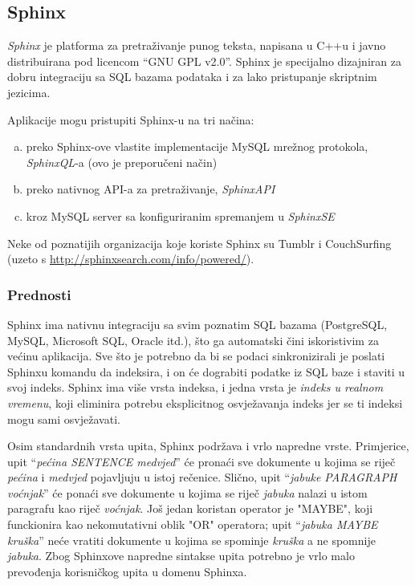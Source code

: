 \documentclass[a4paper,twoside,12pt]{scrreprt}
\begin{document}
\subsection{Sphinx}

\textit{Sphinx} je platforma za pretraživanje punog teksta, napisana u C++u i javno distribuirana pod licencom ``GNU GPL v2.0''. Sphinx je specijalno dizajniran za dobru integraciju sa SQL bazama podataka i za lako pristupanje skriptnim jezicima.

Aplikacije mogu pristupiti Sphinx-u na tri načina:

\begin{enumerate}[(a)]
  \item preko Sphinx-ove vlastite implementacije MySQL mrežnog protokola, \textit{SphinxQL}-a (ovo je preporučeni način)
  \item preko nativnog API-a za pretraživanje, \textit{SphinxAPI}
  \item kroz MySQL server sa konfiguriranim spremanjem u \textit{SphinxSE}
\end{enumerate}

Neke od poznatijih organizacija koje koriste Sphinx su Tumblr i CouchSurfing (uzeto s \url{http://sphinxsearch.com/info/powered/}).

\subsubsection{Prednosti}

Sphinx ima nativnu integraciju sa svim poznatim SQL bazama (PostgreSQL, MySQL, Microsoft SQL, Oracle itd.), što ga automatski čini iskoristivim za većinu aplikacija. Sve što je potrebno da bi se podaci sinkronizirali je poslati Sphinxu komandu da indeksira, i on će dograbiti podatke iz SQL baze i staviti u svoj indeks. Sphinx ima više vrsta indeksa, i jedna vrsta je \textit{indeks u realnom vremenu}, koji eliminira potrebu eksplicitnog osvježavanja indeks jer se ti indeksi mogu sami osvježavati.

Osim standardnih vrsta upita, Sphinx podržava i vrlo napredne vrste. Primjerice, upit ``\textit{pećina SENTENCE medvjed}'' će pronaći sve dokumente u kojima se riječ \textit{pećina} i \textit{medvjed} pojavljuju u istoj rečenice. Slično, upit ``\textit{jabuke PARAGRAPH voćnjak}'' će ponaći sve dokumente u kojima se riječ \textit{jabuka} nalazi u istom paragrafu kao riječ \textit{voćnjak}. Još jedan koristan operator je "MAYBE", koji funckionira kao nekomutativni oblik "OR" operatora; upit ``\textit{jabuka MAYBE kruška}'' neće vratiti dokumente u kojima se spominje \textit{kruška} a ne spomnije \textit{jabuka}. Zbog Sphinxove napredne sintakse upita potrebno je vrlo malo prevođenja korisničkog upita u domenu Sphinxa.
\end{document}

